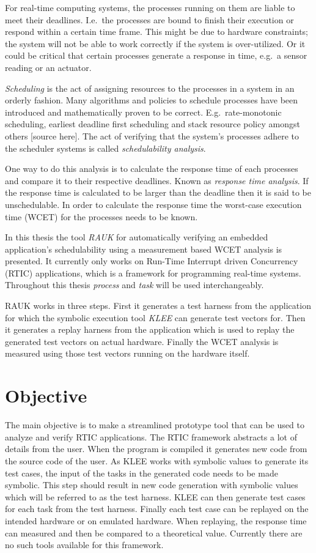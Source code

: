 For real-time computing systems, the processes running on them are liable to
meet their deadlines. I.e.\ the processes are bound to finish their execution
or respond within a certain time frame. This might be due to hardware
constraints; the system will not be able to work correctly if the system is
over-utilized. Or it could be critical that certain processes generate a
response in time, e.g.\ a sensor reading or an actuator.

\emph{Scheduling} is the act of assigning resources to the processes in a
system in an orderly fashion. Many algorithms and policies to schedule
processes have been introduced and mathematically proven to be correct. E.g.\
rate-monotonic scheduling, earliest deadline first scheduling and stack
resource policy amongst others [source here]. The act of verifying that the
system's processes adhere to the scheduler systems is called 
\emph{schedulability analysis}.

One way to do this analysis is to calculate the response time of each processes
and compare it to their respective deadlines. Known as \emph{response time analysis}.
If the response time is calculated to be larger than the deadline then it is said
to be unschedulable. In order to calculate the response time the worst-case
execution time (WCET) for the processes needs to be known. 

In this thesis the tool \emph{RAUK} for automatically verifying an embedded 
application's schedulability using a measurement based WCET analysis is presented. 
It currently only works on Run-Time Interrupt driven Concurrency (RTIC) applications,
which is a framework for programming real-time systems. Throughout this thesis 
\emph{process} and \emph{task} will be used interchangeably.


RAUK works in three steps. First it generates a test harness from the application
for which the symbolic execution tool \emph{KLEE} can generate test vectors for. 
Then it generates a replay harness from the application which is used to replay
the generated test vectors on actual hardware. Finally the WCET analysis is
measured using those test vectors running on the hardware itself.

\section{Objective}
The main objective is to make a streamlined prototype tool that can be used to
analyze and verify RTIC applications. The RTIC framework abstracts a lot of
details from the user. When the program is compiled it generates new code from
the source code of the user. As KLEE works with symbolic values to generate its
test cases, the input of the tasks in the generated code needs to be made
symbolic. This step should result in new code generation with symbolic values
which will be referred to as the test harness. KLEE can then generate test
cases for each task from the test harness. Finally each test case can be
replayed on the intended hardware or on emulated hardware. When replaying, the
response time can measured and then be compared to a theoretical value.
Currently there are no such tools available for this framework.

